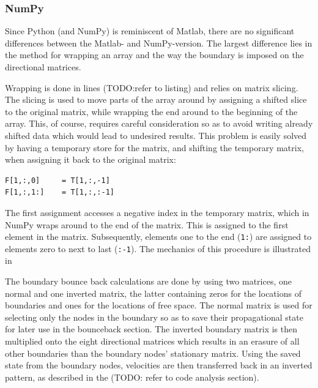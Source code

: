 \subsubsection{NumPy}
Since Python (and NumPy) is reminiscent of Matlab, there are no significant differences between the Matlab- and NumPy-version. The largest difference lies in the method for wrapping an array and the way the boundary is imposed on the directional matrices.

Wrapping is done in lines (TODO:refer to listing) and relies on matrix slicing. The slicing is used to move parts of the array around by assigning a shifted slice to the original matrix, while wrapping the end around to the beginning of the array. This, of course, requires careful consideration so as to avoid writing already shifted data which would lead to undesired results. This problem is easily solved by having a temporary store for the matrix, and shifting the temporary matrix, when assigning it back to the original matrix:

\begin{verbatim}
F[1,:,0]     = T[1,:,-1]
F[1,:,1:]    = T[1,:,:-1]
\end{verbatim}

The first assignment accesses a negative index in the temporary matrix, which in NumPy wraps around to the end of the matrix. This is assigned to the first element in the matrix. Subsequently, elements one to the end (\texttt{1:}) are assigned to elements zero to next to last (\texttt{:-1}). The mechanics of this procedure is illustrated in 


The boundary bounce back calculations are done by using two matrices, one normal and one inverted matrix, the latter containing zeros for the locations of boundaries and ones for the locations of free space. The normal matrix is used for selecting only the nodes in the boundary so as to save their propagational state for later use in the bounceback section. The inverted boundary matrix is then multiplied onto the eight directional matrices which results in an erasure of all other boundaries than the boundary nodes' stationary matrix. Using the saved state from the boundary nodes, velocities are then transferred back in an inverted pattern, as described in the (TODO: refer to code analysis section).



